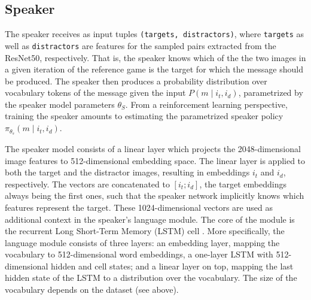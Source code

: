 \subsection{Speaker}
The speaker receives as input tuples \texttt{(targets, distractors)}, where \texttt{targets} as well as \texttt{distractors} are features for the sampled pairs extracted from the ResNet50, respectively. That is, the speaker knows which of the the two images in a given iteration of the reference game is the target for which the message should be produced. The speaker then produces a probability distribution over vocabulary tokens of the message given the input $P(m \mid i_t, i_d)$, parametrized by the speaker model parameters $\theta_S$. From a reinforcement learning perspective, training the speaker amounts to estimating the parametrized speaker policy $\pi_{\theta_s}(m \mid i_t, i_d)$.

The speaker model consists of a linear layer which projects the 2048-dimensional image features to 512-dimensional embedding space. The linear layer is applied to both the target and the distractor images, resulting in embeddings $i_t$ and $i_d$, respectively. The vectors are concatenated to $[i_t; i_d]$, the target embeddings always being the first ones, such that the speaker network implicitly knows which features represent the target. These 1024-dimensional vectors are used as additional context in the speaker's language module. The core of the module is the recurrent Long Short-Term Memory (LSTM) cell \parencite{hochreiter1997long}. More specifically, the language module consists of three layers: an embedding layer, mapping the vocabulary to 512-dimensional word embeddings, a one-layer LSTM with 512-dimensional hidden and cell states; and a linear layer on top, mapping the last hidden state of the LSTM to a distribution over the vocabulary. The size of the vocabulary depends on the dataset (see above).

